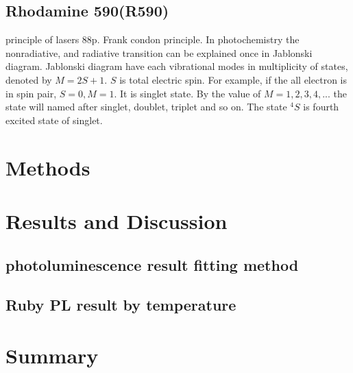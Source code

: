 \documentclass{article}
\begin{document}
\subsection{Rhodamine 590(R590)}
 principle of lasers 88p. Frank condon principle.
 In photochemistry the nonradiative, and radiative transition can be explained once in Jablonski diagram.
 Jablonski diagram have each vibrational modes in multiplicity of states, denoted by $M = 2S+1$. $S$ is total electric spin.
 For example, if the all electron is in spin pair, $S=0 , M=1$.
 It is singlet state.
 By the value of $M=1,2,3,4, ... $ the state will named after singlet, doublet, triplet and so on.
 The state $^4S$ is fourth excited state of singlet.

\section{Methods}

\section{Results and Discussion}
\subsection{photoluminescence result fitting method}
\label{result:iris_effect}

\subsection{Ruby PL result by temperature}
\label{result:temperature_peak_statics}



\section{Summary}



\end{document}
